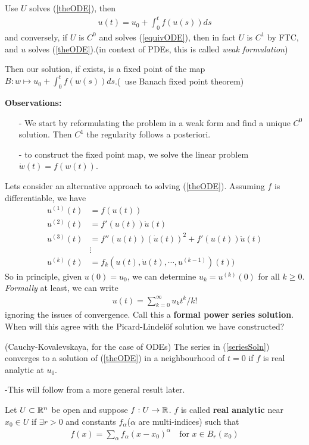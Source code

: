 \documentclass[12pt,a4paper]{report}
\begin{document}
\pf Use $U$ solves (\ref{theODE}), then 
\begin{align}
u(t) = u_0 + \int_0^t f(u(s))ds \label{equivODE}
\end{align}
and conversely, if $U$ is $C^0$ and solves (\ref{equivODE}), then in fact $U$ is $C^1$ by FTC, and $u$ solves (\ref{theODE}).(in context of PDEs, this is called \emph{weak formulation})

Then our solution, if exists, is a fixed point of the map $B : w \mapsto u_0 + \int_0^t f(w(s))ds$.(~use Banach fixed point theorem)
\s

\textbf{Observations:}
\begin{itemize}
\item[-] We start by reformulating the problem in a weak form and find a unique $C^0$ solution. Then $C^1$ the regularity follows a posteriori.
\item[-] to construct the fixed point map, we solve the linear problem $\dot{w}(t) = f(w(t))$.
\end{itemize}
\s

Lets consider an alternative approach to solving (\ref{theODE}). Assuming $f$ is differentiable, we have
\begin{align*}
u^{(1)}(t) &= f(u(t)) \\
u^{(2)}(t) &= f'(u(t))\dot{u}(t) \\
u^{(3)}(t) &= f''(u(t))(\dot{u}(t))^2 + f'(u(t))\ddot{u}(t) \\
&\vdots \\
u^{(k)}(t) &= f_k(u(t), \dot{u}(t),\cdots, u^{(k-1)})(t))
\end{align*}
So in principle, given $u(0) = u_0$, we can determine $u_k = u^{(k)}(0)$ for all $k \geq 0$. \emph{Formally} at least, we can write
\begin{align}
u(t) = \sum_{k=0}^{\infty} u_k t^k / k! \label{seriesSoln}
\end{align}
ignoring the issues of convergence. Call this a \textbf{formal power series solution}. When will this agree with the Picard-Lindel\"{o}f solution we have constructed?
\s

\thm(Cauchy-Kovalevskaya, for the case of ODEs) The series in (\ref{seriesSoln}) converges to a solution of (\ref{theODE}) in a neighbourhood of $t=0$ if $f$ is real analytic at $u_0$.

-This will follow from a more general result later.
\s

 Let $U \subset \mathbb{R}^n$ be open and suppose $f: U \rightarrow \mathbb{R}$. $f$ is called \textbf{real analytic} near $x_0 \in U$ if $\exists r >0$ and constants $f_{\alpha}$($\alpha$ are multi-indices) such that
\begin{align*}
f(x) = \sum_{\alpha}f_{\alpha} (x-x_0)^{\alpha} \quad \text{for } x \in B_r(x_0)
\end{align*}
\s
\end{document}
